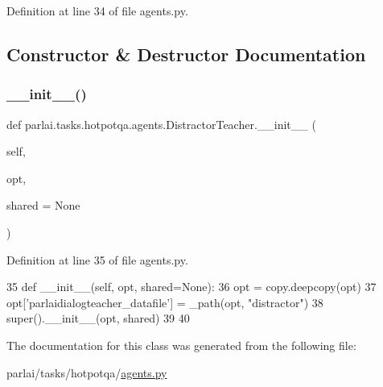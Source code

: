 Definition at line 34 of file agents.\+py.



\subsection{Constructor \& Destructor Documentation}
\mbox{\label{classparlai_1_1tasks_1_1hotpotqa_1_1agents_1_1DistractorTeacher_a933e9ee4fe9a8557477562a9a05d598c}} 
\subsubsection{\texorpdfstring{\+\_\+\+\_\+init\+\_\+\+\_\+()}{\_\_init\_\_()}}
{\footnotesize\ttfamily def parlai.\+tasks.\+hotpotqa.\+agents.\+Distractor\+Teacher.\+\_\+\+\_\+init\+\_\+\+\_\+ (\begin{DoxyParamCaption}\item[{}]{self,  }\item[{}]{opt,  }\item[{}]{shared = {\ttfamily None} }\end{DoxyParamCaption})}



Definition at line 35 of file agents.\+py.


\begin{DoxyCode}
35     \textcolor{keyword}{def }\_\_init\_\_(self, opt, shared=None):
36         opt = copy.deepcopy(opt)
37         opt[\textcolor{stringliteral}{'parlaidialogteacher\_datafile'}] = \_path(opt, \textcolor{stringliteral}{"distractor"})
38         super().\_\_init\_\_(opt, shared)
39 
40 
\end{DoxyCode}


The documentation for this class was generated from the following file\+:\begin{DoxyCompactItemize}
\item 
parlai/tasks/hotpotqa/\hyperlink{parlai_2tasks_2hotpotqa_2agents_8py}{agents.\+py}\end{DoxyCompactItemize}
